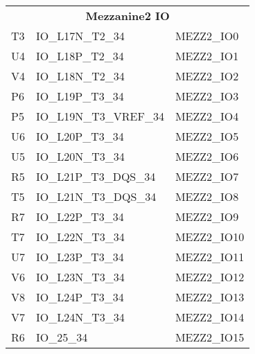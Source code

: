 \begin{footnotesize}
	\begin{longtable}{|l|p{6cm}|p{6cm}|}
		\hline
		\multicolumn{3}{|c|}{\multirow{2}{*}{\textbf{\large{Mezzanine2 IO}}}}\\
		\multicolumn{3}{|c|}{} \\ \hline 
T3	&	IO\_L17N\_T2\_34	&	MEZZ2\_IO0	\\ \hline
U4	&	IO\_L18P\_T2\_34	&	MEZZ2\_IO1	\\ \hline
V4	&	IO\_L18N\_T2\_34	&	MEZZ2\_IO2	\\ \hline
P6	&	IO\_L19P\_T3\_34	&	MEZZ2\_IO3	\\ \hline
P5	&	IO\_L19N\_T3\_VREF\_34	&	MEZZ2\_IO4	\\ \hline
U6	&	IO\_L20P\_T3\_34	&	MEZZ2\_IO5	\\ \hline
U5	&	IO\_L20N\_T3\_34	&	MEZZ2\_IO6	\\ \hline
R5	&	IO\_L21P\_T3\_DQS\_34	&	MEZZ2\_IO7	\\ \hline
T5	&	IO\_L21N\_T3\_DQS\_34	&	MEZZ2\_IO8	\\ \hline
R7	&	IO\_L22P\_T3\_34	&	MEZZ2\_IO9	\\ \hline
T7	&	IO\_L22N\_T3\_34	&	MEZZ2\_IO10	\\ \hline
U7	&	IO\_L23P\_T3\_34	&	MEZZ2\_IO11	\\ \hline
V6	&	IO\_L23N\_T3\_34	&	MEZZ2\_IO12	\\ \hline
V8	&	IO\_L24P\_T3\_34	&	MEZZ2\_IO13	\\ \hline
V7	&	IO\_L24N\_T3\_34	&	MEZZ2\_IO14	\\ \hline
R6	&	IO\_25\_34	&	MEZZ2\_IO15	\\ \hline
	
	\end{longtable}
\end{footnotesize}

